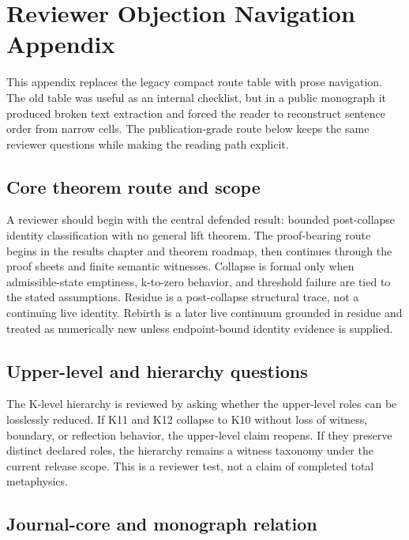 \section{Reviewer Objection Navigation Appendix}

\label{sec:oc13-reviewer-navigation}

This appendix replaces the legacy compact route table with prose navigation. The old table was useful as an internal checklist, but in a public monograph it produced broken text extraction and forced the reader to reconstruct sentence order from narrow cells. The publication-grade route below keeps the same reviewer questions while making the reading path explicit.


\subsection{Core theorem route and scope}

A reviewer should begin with the central defended result: bounded post-collapse identity classification with no general lift theorem. The proof-bearing route begins in the results chapter and theorem roadmap, then continues through the proof sheets and finite semantic witnesses. Collapse is formal only when admissible-state emptiness, k-to-zero behavior, and threshold failure are tied to the stated assumptions. Residue is a post-collapse structural trace, not a continuing live identity. Rebirth is a later live continuum grounded in residue and treated as numerically new unless endpoint-bound identity evidence is supplied.


\subsection{Upper-level and hierarchy questions}

The K-level hierarchy is reviewed by asking whether the upper-level roles can be losslessly reduced. If K11 and K12 collapse to K10 without loss of witness, boundary, or reflection behavior, the upper-level claim reopens. If they preserve distinct declared roles, the hierarchy remains a witness taxonomy under the current release scope. This is a reviewer test, not a claim of completed total metaphysics.


\subsection{Journal-core and monograph relation}

